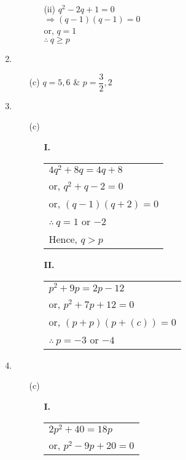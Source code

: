 \begin{multicols}{2}
\begin{enumerate}
\begin{itemize}
\begin{itemize}
  \item[(ii)] $q^2 - 2q + 1 = 0$\\
    $\Rightarrow (q - 1)(q - 1) = 0$\\
    or, $q = 1$\\
    $\therefore~ q \geq p$
    \end{itemize}
\end{itemize}
\item
  \begin{itemize}
\item[(c)] $q = 5, 6$ \& $p = \dfrac{3}{2}, 2$
  \end{itemize}
\item
  \begin{itemize}
  \item[(c)]
    \begin{multicols}{2}
      \begin{itemize}
      \item[{\bf I.}]
        \begin{tabular}[t]{l}
          $4q^2 + 8q = 4q + 8$\\
          or, $q^2 + q - 2 = 0$\\
          or, $(q - 1)(q + 2) = 0$\\
          $\therefore~ q = 1$ or $- 2$\\
          Hence, $q > p$
        \end{tabular}
      \item[{\bf II.}]
        \begin{tabular}[t]{l}
          $p^2 + 9p = 2p - 12$\\
          or, $p^2 + 7p + 12 = 0$\\
          or, $(p + p)(p + (c)) = 0$\\
          $\therefore~ p = -3$ or $-4$
          \end{tabular}
       \end{itemize}
     \end{multicols}
  \end{itemize}
\item
  \begin{itemize}
  \item[(c)]
        \begin{multicols}{2}
      \begin{itemize}
      \item[{\bf I.}]
        \begin{tabular}[t]{l}
          $2p^2 + 40 = 18p$\\
          or, $p^2 - 9p + 20 = 0$\\

\end{tabular}
\end{itemize}
\end{multicols}
\end{itemize}
\end{enumerate}
\end{multicols}
